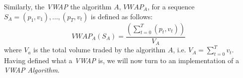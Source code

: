 Similarly, the \textit{VWAP} the algorithm $A$, $VWAP_A$, for a sequence $S_A = (p_1, v_1), \ldots, (p_T, v_t)$ is defined as follows:
\begin{equation}  
\label{Equation/Algo-Vwap}
VWAP_A(S_A) = \frac{\left( \displaystyle\sum\limits_{t=0}^T (p_t, v_t) \right)}{V_A}
\end{equation}
where $V_a$ is the total volume traded by the algorithm $A$, i.e. $V_A = \displaystyle\sum\limits_{t=0}^T v_t$. Having defined what a \textit{VWAP} is, we will now turn to an implementation of a \textit{VWAP Algorithm}.


